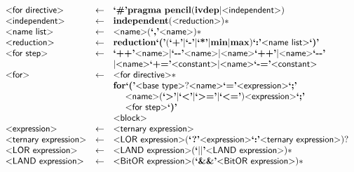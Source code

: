 \begin{figure}
  \ContinuedFloat
\[
\begin{array}{lcl}
  \pgrammar{for directive} & \gets & \plexer{\#} \pkeyword{pragma} ~ \pkeyword{pencil} (\pkeyword{ivdep} | \pgrammar{independent})\\

  \pgrammar{independent} & \gets & \pkeyword{independent} (\pgrammar{reduction})*\\

  \pgrammar{name list} & \gets & \pgrammar{name} (\plexer{,} \pgrammar{name})*\\
  \pgrammar{reduction} & \gets & \pkeyword{reduction} \plexer{(} (\plexer{+}|\plexer{-}|\plexer{*}|\pkeyword{min}|\pkeyword{max}) \plexer{:} \pgrammar{name list}\plexer{)}\\

  \pgrammar{for step} & \gets & \plexer{++} \pgrammar{name}
  | \plexer{{-}{-}} \pgrammar{name}
  | \pgrammar{name} \plexer{++}
  | \pgrammar{name} \plexer{{-}{-}}\\&&
  | \pgrammar{name} \plexer{{+}=} \pgrammar{constant}
  | \pgrammar{name} \plexer{{-}=} \pgrammar{constant}\\

  \pgrammar{for} & \gets & \pgrammar{for directive}*\\&& \pkeyword{for} \plexer{(}
  \pgrammar{base type}? \pgrammar{name} \plexer{=} \pgrammar{expression} \plexer{;}\\&&
    ~ ~ ~ ~\pgrammar{name} (\text{\plexer{\textgreater}}|\text{\plexer{\textless}}|\text{\plexer{\textgreater=}}|\text{\plexer{\textless=}}) \pgrammar{expression}\plexer{;}\\&&
    ~ ~ ~ ~\pgrammar{for step} \plexer{)}\\&&\pgrammar{block}\\

  \pgrammar{expression} & \gets & \pgrammar{ternary expression}\\

  \pgrammar{ternary expression} & \gets & \pgrammar{LOR expression}
  (\plexer{?} \pgrammar{expression} \plexer{:} \pgrammar{ternary expression})?\\

  \pgrammar{LOR expression} & \gets & \pgrammar{LAND expression} (\plexer{$||$} \pgrammar{LAND expression})*\\

  \pgrammar{LAND expression} & \gets & \pgrammar{BitOR expression} (\plexer{\&\&} \pgrammar{BitOR expression})*\\


\end{array}\]
\end{figure}
